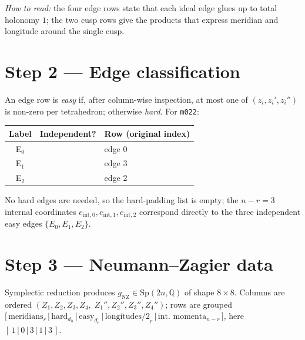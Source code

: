 \documentclass[11pt,a4paper]{article}
\newcommand{\pass}{{\color{green!55!black}\ding{51}}}
\begin{document}
\emph{How to read:} the four edge rows state that each ideal edge glues
up to total holonomy \(1\); the two cusp rows give the products that
express meridian and longitude around the single cusp.

\section{Step 2 --- Edge classification}

An edge row is \emph{easy} if, after column-wise inspection, at most one
of \((z_i, z_i', z_i'')\) is non-zero per tetrahedron; otherwise
\emph{hard}.  For \texttt{m022}:

\begin{center}
\begin{tabular}{c c l}
\toprule
Label       & Independent? & Row (original index)  \\
\midrule
E\(_0\)     & \pass        & edge 0 \\
E\(_1\)     & \pass        & edge 3 \\
E\(_2\)     & \pass        & edge 2 \\
\bottomrule
\end{tabular}
\end{center}

No hard edges are needed, so the hard-padding list is empty; the
\(n-r=3\) internal coordinates \(e_{\text{int},0},
e_{\text{int},1}, e_{\text{int},2}\) correspond directly to the three
independent easy edges \(\{E_0, E_1, E_2\}\).

\section{Step 3 --- Neumann--Zagier data}

Symplectic reduction produces
\(g_{\text{NZ}} \in \mathrm{Sp}(2n, \mathbb{Q})\) of shape \(8\times 8\).
Columns are ordered \((Z_1, Z_2, Z_3, Z_4,\; Z_1'', Z_2'', Z_3'', Z_4'')\);
rows are grouped
\(\bigl[\,\text{meridians}_r \,\vert\, \text{hard}_{d_h} \,\vert\,
   \text{easy}_{d_e} \,\vert\, \text{longitudes/2}_r \,\vert\,
   \text{int.\ momenta}_{n-r}\,\bigr]\),
here \([\,1 \,\vert\, 0 \,\vert\, 3 \,\vert\, 1 \,\vert\, 3\,]\).
\end{document}
